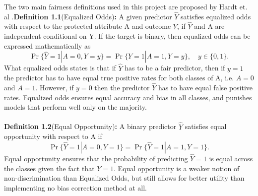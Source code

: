 \documentclass[11pt, fleqn, titlepage]{article}
\begin{document}
	The two main fairness definitions used in this project are proposed by Hardt et. al \cite{equal_of_oppor}.\newline \textbf{Definition 1.1}(Equalized Odds)\textbf{:} A given predictor $ \hat Y $ satisfies equalized odds with respect to the protected attribute A and outcome $ Y $, if $ \hat Y $ and A are independent conditional on Y. If the target is binary, then equalized odds can be expressed mathematically as
	\begin{equation*}\label{key}
	\operatorname{Pr}\{\widehat{Y}=1 | A=0, Y=y\}=\operatorname{Pr}\{\hat{Y}=1 | A=1, Y=y\}, \quad y \in\{0,1\}.
	\end{equation*}
	What equalized odds states is that if $ \hat Y $ has to be a fair predictor, then if $ y = 1 $ the predictor has to have equal true positive rates for both classes of A, i.e. $ A = 0 $  and $ A = 1 $. However, if $ y = 0 $ then the predictor $ \hat Y $ has to have equal false positive rates. Equalized odds ensures equal accuracy and bias in all classes, and punishes models that perform well only on the majority.
	\\\\
	\textbf{Definition 1.2}(Equal Opportunity)\textbf{:} A binary predictor $ \hat Y $ satisfies equal opportunity with respect to A if 
	\begin{equation*}
		\operatorname{Pr}\{\hat{Y}=1 | A=0, Y=1\}=\operatorname{Pr}\{\hat{Y}=1 | A=1, Y=1\}.
	\end{equation*}
	Equal opportunity ensures that the probability of predicting $ \hat Y = 1 $ is equal across the classes given the fact that $ Y = 1 $. Equal opportunity is a weaker notion of non-discrimination than Equalized Odds, but still allows for better utility than implementing no bias correction method at all.
	
	
\end{document}
